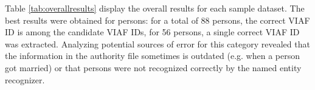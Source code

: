 \documentclass{article}
\begin{document}
\begin{table}[h!]
\caption{Results for automatic VIAF ID extraction for the 4 sample datasets}
\label{tab:overallresults}
\end{table}
Table \ref{tab:overallresults} display the overall results for each sample dataset. The best results were obtained for persons: for a total of 88 persons, the correct VIAF ID is among the candidate VIAF IDs, for 56 persons, a single correct VIAF ID was extracted.
Analyzing potential sources of error for this category revealed that the information in the authority file sometimes is outdated (e.g. when a person got married) or that persons were not recognized correctly by the named entity recognizer.
\end{document}
